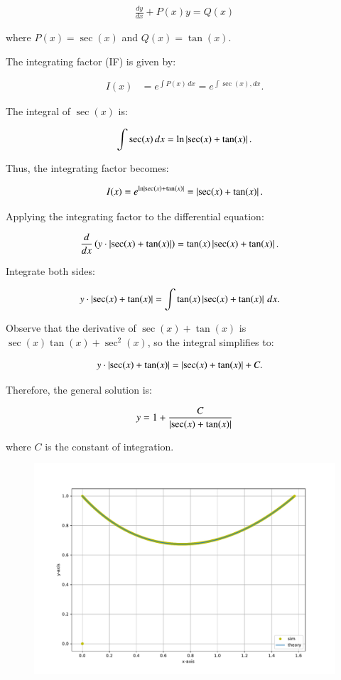 \documentclass[journal]{IEEEtran}
\begin{document}
\begin{align*}
\frac{dy}{dx} + P(x)y = Q(x)
\end{align*}

where $P(x) = \sec(x)$ and $Q(x) = \tan(x)$.

The integrating factor (IF) is given by:

\begin{align*}
I(x) &= e^{\int P(x) \, dx} = e^{\int \sec (x), dx}.
\end{align*}

The integral of $\sec(x)$ is:

\begin{align*}
\int \sec(x) \, dx = \ln \left\vert\sec(x) + \tan(x)\right\vert.
\end{align*}

Thus, the integrating factor becomes:

\begin{align*}
I(x) = e^{\ln\left\vert\sec(x) + \tan(x)\right\vert} = \left\vert\sec(x) + \tan(x)\right\vert.
\end{align*}

Applying the integrating factor to the differential equation:

\begin{align*}
\frac{d}{dx}\left( y \cdot \left\vert\sec(x) + \tan(x)\right\vert\right) &= \tan(x) \left\vert\sec(x) + \tan(x)\right\vert.
\end{align*}

Integrate both sides:

\begin{align*}
y \cdot \left\vert\sec(x) + \tan(x)\right\vert &= \int \tan(x) \left\vert\sec(x) + \tan(x)\right\vert \, dx.
\end{align*}

Observe that the derivative of $\sec(x) + \tan(x)$ is $\sec(x)\tan(x) + \sec^2(x)$, so the integral simplifies to:

\begin{align*}
y \cdot \left\vert\sec(x) + \tan(x)\right\vert &= \left\vert\sec(x) + \tan(x)\right\vert + C.
\end{align*}

Therefore, the general solution is:

\begin{align*}
y = 1 + \frac{C}{\left\vert\sec(x) + \tan(x)\right\vert}
\end{align*}

where $C$ is the constant of integration.

\begin{figure}[h!]
   \centering
   \includegraphics[width=0.7\columnwidth]{figs/combined_plot.pdf}
\end{figure}
\end{document}

